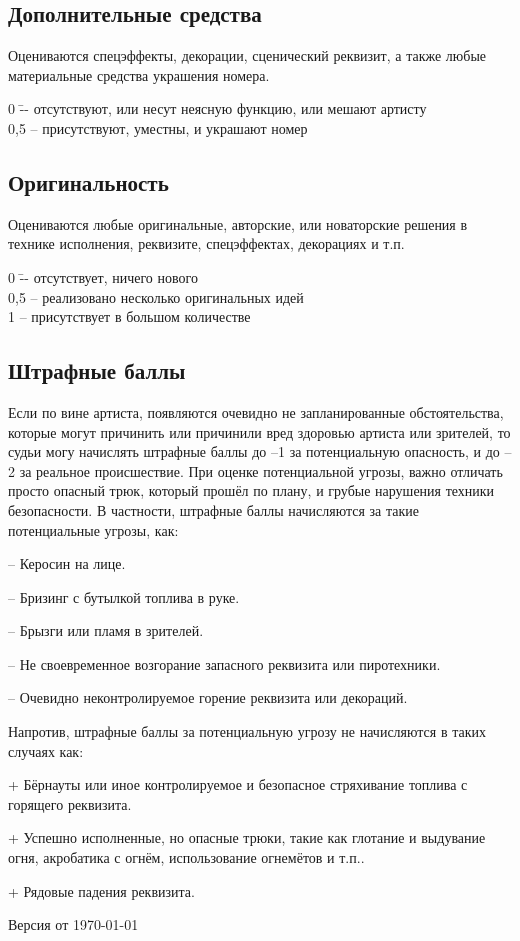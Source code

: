 \documentclass[12pt]{article}
\begin{document}
\subsection{Дополнительные средства}
Оцениваются спецэффекты, декорации, сценический реквизит, а также любые материальные средства украшения номера.

\begin{tabbing}
0\hspace{0.8em} \=-- отсутствуют, или несут неясную функцию, или мешают артисту\\
0,5 \>-- присутствуют, уместны, и украшают номер
\end{tabbing}


\subsection{Оригинальность}
Оцениваются любые оригинальные, авторские, или новаторские решения в технике исполнения, реквизите, спецэффектах, декорациях и т.п.

\begin{tabbing}
0\hspace{0.8em} \=-- отсутствует, ничего нового\\
0,5 \>-- реализовано несколько оригинальных идей\\
1 \>-- присутствует в большом количестве
\end{tabbing}


\subsection{Штрафные баллы}
Если по вине артиста, появляются очевидно не запланированные обстоятельства, которые могут причинить или причинили вред здоровью артиста или зрителей, то судьи могу начислять штрафные баллы до --1 за потенциальную опасность, и до --2 за реальное происшествие. При оценке потенциальной угрозы, важно отличать просто опасный трюк, который прошёл по плану, и грубые нарушения техники безопасности. В частности, штрафные баллы начисляются за такие потенциальные угрозы, как:


-- Керосин на лице.

-- Бризинг с бутылкой топлива в руке.

-- Брызги или пламя в зрителей.

-- Не своевременное возгорание запасного реквизита или пиротехники.

-- Очевидно неконтролируемое горение реквизита или декораций.

\vspace{1em}
Напротив, штрафные баллы за потенциальную угрозу не начисляются в таких случаях как:
\vspace{1em}

+ Бёрнауты или иное контролируемое и безопасное стряхивание топлива с горящего реквизита.

+ Успешно исполненные, но опасные трюки, такие как глотание и выдувание огня, акробатика с огнём, использование огнемётов и т.п..

+ Рядовые падения реквизита.


\vspace{4em}
\hfill Версия от  \today
\end{document}
